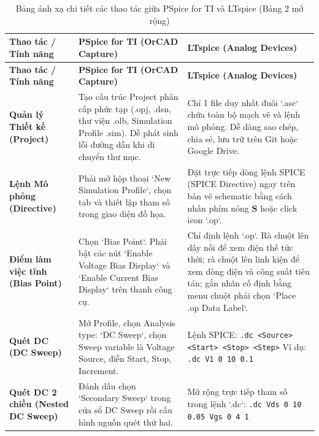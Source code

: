 \documentclass[12pt,a4paper]{report}
\begin{document}
\begin{longtable}{|p{3.2cm}|p{6.0cm}|p{6.0cm}|}
\caption{Bảng ánh xạ chi tiết các thao tác giữa PSpice for TI và LTspice (Bảng 2 mở rộng)}
\label{tab:anh_xa_thao_tac}\\
\hline
\rowcolor{codebg}
\textbf{Thao tác / Tính năng} & \textbf{PSpice for TI (OrCAD Capture)} & \textbf{LTspice (Analog Devices)} \\ \hline
\endfirsthead
\hline
\rowcolor{codebg}
\textbf{Thao tác / Tính năng} & \textbf{PSpice for TI (OrCAD Capture)} & \textbf{LTspice (Analog Devices)} \\ \hline
\endhead
\hline
\endfoot

\textbf{Quản lý Thiết kế (Project)} & 
Tạo cấu trúc Project phân cấp phức tạp (.opj, .dsn, thư viện .olb, Simulation Profile .sim). Dễ phát sinh lỗi đường dẫn khi di chuyển thư mục. & 
Chỉ 1 file duy nhất đuôi `.asc` chứa toàn bộ mạch vẽ và lệnh mô phỏng. Dễ dàng sao chép, chia sẻ, lưu trữ trên Git hoặc Google Drive. \\ \hline

\textbf{Lệnh Mô phỏng (Directive)} & 
Phải mở hộp thoại `New Simulation Profile`, chọn tab và thiết lập tham số trong giao diện đồ họa. & 
Đặt trực tiếp dòng lệnh SPICE (SPICE Directive) ngay trên bản vẽ schematic bằng cách nhấn phím nóng \textbf{S} hoặc click icon `.op`. \\ \hline

\textbf{Điểm làm việc tĩnh (Bias Point)} & 
Chọn `Bias Point`. Phải bật các nút `Enable Voltage Bias Display` và `Enable Current Bias Display` trên thanh công cụ. & 
Chỉ định lệnh `.op`. Rà chuột lên dây nối để xem điện thế tức thời; rà chuột lên linh kiện để xem dòng điện và công suất tiêu tán; gắn nhãn cố định bằng menu chuột phải chọn `Place .op Data Label`. \\ \hline

\textbf{Quét DC (DC Sweep)} & 
Mở Profile, chọn Analysis type: `DC Sweep`, chọn Sweep variable là Voltage Source, điền Start, Stop, Increment. & 
Lệnh SPICE: \lstinline|.dc <Source> <Start> <Stop> <Step>|\newline 
Ví dụ: \lstinline|.dc V1 0 10 0.1| \\ \hline

\textbf{Quét DC 2 chiều (Nested DC Sweep)} & 
Đánh dấu chọn `Secondary Sweep` trong cửa sổ DC Sweep rồi cấu hình nguồn quét thứ hai. & 
Mở rộng trực tiếp tham số trong lệnh `.dc`:\newline 
\lstinline|.dc Vds 0 10 0.05 Vgs 0 4 1| \\ \hline


\end{longtable}
\end{document}

